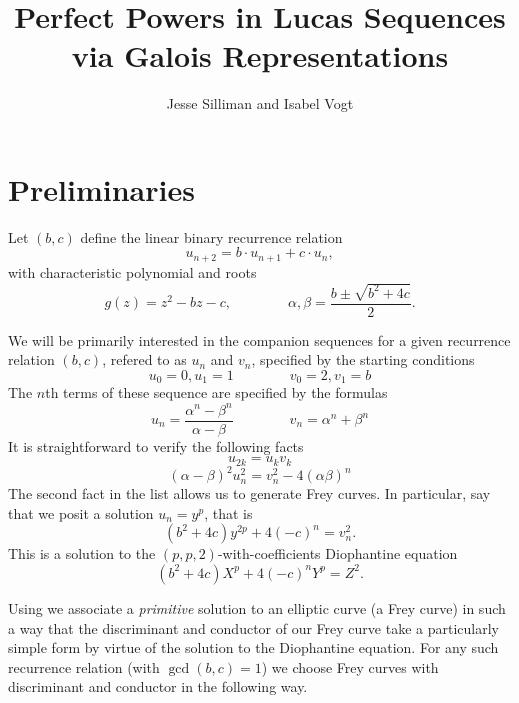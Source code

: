 \documentclass[12pt]{amsart}
\theoremstyle{definition}
\begin{document}
\title{Perfect Powers in Lucas Sequences via Galois Representations}
\author{Jesse Silliman and Isabel Vogt}

\maketitle


\section{Preliminaries}

Let $(b,c)$ define the linear binary recurrence relation
\[ u_{n+2} = b\cdot u_{n+1}+ c\cdot u_n, \]
with characteristic polynomial and roots
\[ g(z) = z^2 - bz - c, \qquad \qquad \alpha, \beta = \frac{b \pm \sqrt{b^2+4c}}{2}.\]

We will be primarily interested in the companion sequences for a given recurrence relation $(b,c)$, refered to as $u_n$ and $v_n$, specified by the starting conditions
\[ u_0 = 0, u_1 = 1 \qquad \qquad v_0 = 2, v_1 = b \]
The $n$th terms of these sequence are specified by the formulas
\[u_n = \frac{\alpha^n - \beta^n}{\alpha - \beta} \qquad \qquad v_n = \alpha^n +\beta^n \]
It is straightforward to verify the following facts
\begin{equation}\label{fib2} u_{2k} = u_kv_k \end{equation}
\begin{equation}\label{gen_diophan}(\alpha - \beta)^2u_n^2 = v_n^2 - 4(\alpha\beta)^n \end{equation}
The second fact in the list allows us to generate Frey curves.  In particular, say that we posit a solution $u_n = y^p$, that is
\begin{equation}\label{rel_diophan} (b^2+4c)y^{2p}+4(-c)^n = v_n^2 .\end{equation}
This is a solution to the $(p,p,2)$-with-coefficients Diophantine equation
\[ (b^2+4c)X^p +4(-c)^nY^p = Z^2. \]

Using \cite{bennett04} we associate a \textit{primitive} solution to an elliptic curve (a Frey curve) in such a way that the discriminant and conductor of our Frey curve take a particularly simple form by virtue of the solution to the Diophantine equation.  For any such recurrence relation (with $\gcd(b,c)=1$) we choose Frey curves with discriminant and conductor in the following way.
\end{document}
